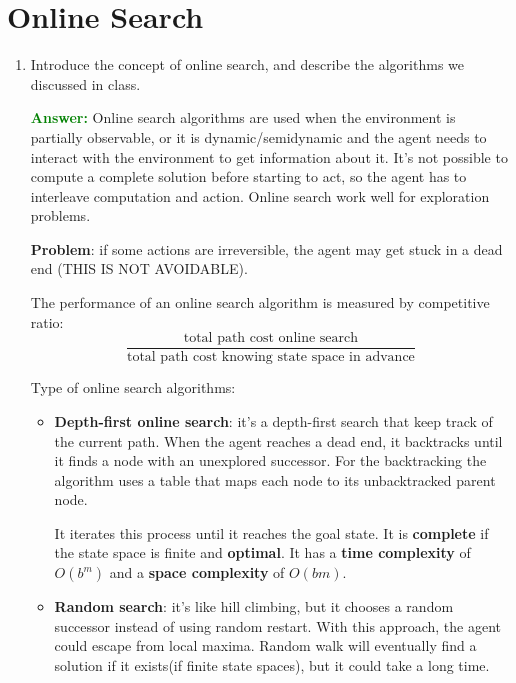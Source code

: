 \documentclass[12pt]{article}
\begin{document}
\section{Online Search}\label{onlinesearch}
\begin{enumerate}[label=\textbf{OS.\arabic*}]
    \item Introduce the concept of online search, and describe the algorithms we discussed in class.
    
    \textcolor{green}{\textbf{Answer:}}
    Online search algorithms are used when the environment is partially observable, or it is dynamic/semidynamic 
    and the agent needs to interact with the environment to get information about it.
    It's not possible to compute a complete solution before starting to act, so the agent has to interleave computation and action.
    Online search work well for exploration problems.
    
    \textbf{Problem}: if some actions are irreversible, the agent may get stuck in a dead end (THIS IS NOT AVOIDABLE).

    The performance of an online search algorithm is measured by competitive ratio:
    \begin{equation}
        \frac{\text{total path cost online search}}{\text{total path cost knowing state space in advance}}
        \label{eq:competitive-ratio}
    \end{equation}

    Type of online search algorithms:
    \begin{itemize}
        \item \textbf{Depth-first online search}: it's a depth-first search that keep track of the current path.
        When the agent reaches a dead end, it backtracks until it finds a node with an unexplored successor.
        For the backtracking the algorithm uses a table that maps each node to its unbacktracked parent node.

        It iterates this process until it reaches the goal state.
        It is \textbf{complete} if the state space is finite and \textbf{optimal}.
        It has a \textbf{time complexity} of $O(b^m)$ and a \textbf{space complexity} of $O(bm)$.
        \item \textbf{Random search}: it's like hill climbing, but it chooses a random successor instead of using random restart.
        With this approach, the agent could escape from local maxima.
        Random walk will eventually find a solution if it exists(if finite state spaces), but it could take a long time.
        

\end{itemize}
\end{enumerate}
\end{document}
